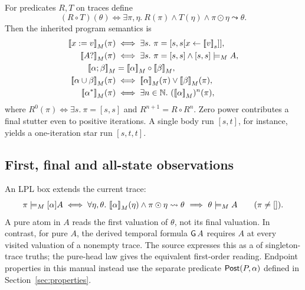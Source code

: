 For predicates $R,T$ on traces define
\[
 (R\circ T)(\theta)\iff
 \exists\pi,\eta.\ R(\pi)\land T(\eta)\land\pi\odot\eta\leadsto\theta.
\]
Then the inherited program semantics is
\begin{align*}
 \interp{x:=v}_M(\pi)&\iff
   \exists s.\ \pi=[s,s[x\leftarrow\eval v s]],\\
 \interp{A?}_M(\pi)&\iff\exists s.\ \pi=[s,s]\land[s,s]\sat_M A,\\
 \interp{\alpha;\beta}_M&=\interp\alpha_M\circ\interp\beta_M,\\
 \interp{\alpha\cup\beta}_M(\pi)&\iff
   \interp\alpha_M(\pi)\lor\interp\beta_M(\pi),\\
 \interp{\alpha^*}_M(\pi)&\iff\exists n\in\N.\ (\interp\alpha_M)^n(\pi),
\end{align*}
where $R^0(\pi)\iff\exists s.\ \pi=[s,s]$ and
$R^{n+1}=R\circ R^n$. Zero power contributes a final stutter even to
positive iterations. A single body run $[s,t]$, for instance, yields a
one-iteration star run $[s,t,t]$.

\subsection{First, final and all-state observations}
An LPL box extends the current trace:
\[
 \pi\models_M[\alpha]A\iff
 \forall\eta,\theta.\ \mathopen{[\![}\alpha\mathclose{]\!]}_M(\eta)\land
 \pi\odot\eta\leadsto\theta\ \Longrightarrow\ \theta\models_M A
 \qquad(\pi\ne[]).
\]
A pure atom in $A$ reads the first valuation of $\theta$, not its final
valuation. In contrast, for pure $A$, the derived temporal formula
$\mathsf{G}\,A$ requires $A$ at every visited valuation of a nonempty trace.
The source expresses this as a  of singleton-trace truths;
the pure-head law gives the equivalent first-order reading.
Endpoint properties in this manual instead use the separate predicate
$\mathsf{Post}(P,\alpha)$ defined in Section~\ref{sec:properties}.
